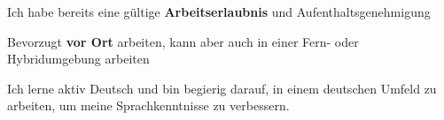 
\begin{cvparagraph}
  \vspace{0.5em}
  \begin{cvitems}
    \item {Ich habe bereits eine gültige \textbf{Arbeitserlaubnis} und {Aufenthaltsgenehmigung}}
    \item {Bevorzugt \textbf{vor Ort} arbeiten, kann aber auch in einer Fern- oder Hybridumgebung arbeiten}
    
    \item {Ich lerne aktiv Deutsch und bin begierig darauf, in einem deutschen Umfeld zu arbeiten, \newline um meine Sprachkenntnisse zu verbessern.}
  \end{cvitems}
\end{cvparagraph}
